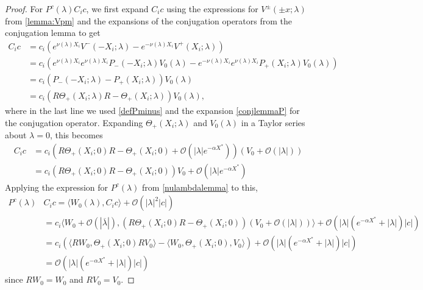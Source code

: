 \documentclass[thesis.tex]{subfiles}
\begin{document}
\begin{lemma}
\begin{proof}
For $P^c(\lambda)C_i c$, we first expand $C_i c$ using the expressions for $V^\pm(\pm x; \lambda)$ from \cref{lemma:Vpm} and the expansions of the conjugation operators from the conjugation lemma to get
\begin{align*}
C_i c &= c_i \left( e^{\nu(\lambda) X_i} V^-(-X_i; \lambda) - e^{-\nu(\lambda) X_i} V^+(X_i; \lambda) \right) \\
&= c_i \left( e^{\nu(\lambda) X_i} e^{\nu(\lambda)X_i} P_-(-X_i; \lambda) V_0(\lambda) - e^{-\nu(\lambda) X_i} e^{\nu(\lambda)X_i} P_+(X_i; \lambda)V_0(\lambda) \right) \\
&= c_i \left( P_-(-X_i; \lambda) - P_+(X_i; \lambda) \right) V_0(\lambda) \\
&= c_i \left( R \Theta_+(X_i; \lambda) R - \Theta_+(X_i; \lambda) \right) V_0(\lambda),
\end{align*}
where in the last line we used \cref{defPminus} and the expansion \cref{conjlemmaP} for the conjugation operator. Expanding $\Theta_+(X_i; \lambda)$ and $V_0(\lambda)$ in a Taylor series about $\lambda = 0$, this becomes
\begin{align*}
C_i c &= c_i \left( R \Theta_+(X_i; 0) R - \Theta_+(X_i; 0) + \mathcal{O}(|\lambda|e^{-\alpha X^*}) \right) (V_0 + \mathcal{O}(|\lambda|)) \\
&= c_i \left( R \Theta_+(X_i; 0) R - \Theta_+(X_i; 0) \right) V_0 + \mathcal{O}(|\lambda|e^{-\alpha X^*})
\end{align*}
Applying the expression for $P^c(\lambda)$ from \cref{nulambdalemma} to this,
\begin{align*}
P^c(\lambda)&C_i c = \langle W_0(\lambda), C_i c \rangle + \mathcal{O}(|\lambda|^2 |c| ) \\
&= c_i \langle W_0 + \mathcal{O}(|\overline{\lambda}|),(R \Theta_+(X_i; 0) R - \Theta_+(X_i; 0) )( V_0 + \mathcal{O}(|\lambda|)) \rangle + \mathcal{O}(|\lambda|(e^{-\alpha X^*} + |\lambda|)|c|) \\
&= c_i \left( \langle R W_0, \Theta_+(X_i; 0) R V_0 \rangle - \langle W_0, \Theta_+(X_i; 0), V_0 \rangle \right) + \mathcal{O}(|\lambda|(e^{-\alpha X^*} + |\lambda|)|c|) \\
&= \mathcal{O}(|\lambda|(e^{-\alpha X^*} + |\lambda|)|c|) 
\end{align*}
since $R W_0 = W_0$ and $RV_0 = V_0$.


\end{proof}
\end{lemma}
\end{document}
